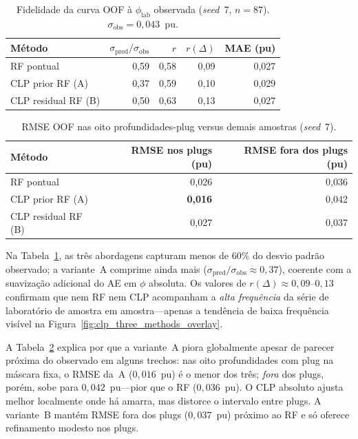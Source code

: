 \documentclass[11pt,a4paper]{article}
\newcommand{\philab}{\ensuremath{\phi_{\mathrm{lab}}}}
\begin{document}
\begin{table}[H]
  \centering
  \caption{Fidelidade da curva OOF à \philab{} observada (\emph{seed}~7,
           $n=87$). $\sigma_{\mathrm{obs}}=0{,}043$~pu.}
  \label{tab:clp_fidelity}
  \small
  \begin{tabular}{lrrrr}
    \toprule
    Método & $\sigma_{\mathrm{pred}}/\sigma_{\mathrm{obs}}$ &
    $r$ & $r(\Delta)$ & MAE (pu) \\
    \midrule
    RF pontual & 0,59 & 0,58 & 0,09 & 0,027 \\
    CLP prior RF (A) & 0,37 & 0,59 & 0,10 & 0,029 \\
    CLP residual RF (B) & 0,50 & 0,63 & 0,13 & 0,027 \\
  \end{tabular}
\end{table}

\begin{table}[H]
  \centering
  \caption{RMSE OOF nas oito profundidades-plug versus demais amostras
           (\emph{seed}~7).}
  \label{tab:clp_plug_vs_nonplug}
  \begin{tabular}{lrr}
    \toprule
    Método & RMSE nos plugs (pu) & RMSE fora dos plugs (pu) \\
    \midrule
    RF pontual & 0,026 & 0,036 \\
    CLP prior RF (A) & \textbf{0,016} & 0,042 \\
    CLP residual RF (B) & 0,027 & 0,037 \\
    \bottomrule
  \end{tabular}
\end{table}

Na Tabela~\ref{tab:clp_fidelity}, as três abordagens capturam menos de
60\% do desvio padrão observado; a variante~A comprime ainda mais
($\sigma_{\mathrm{pred}}/\sigma_{\mathrm{obs}}\approx 0{,}37$), coerente
com a suavização adicional do AE em $\phi$ absoluta.
Os valores de $r(\Delta)\approx 0{,}09$--$0{,}13$ confirmam que nem RF nem
CLP acompanham a \emph{alta frequência} da série de laboratório de
amostra em amostra---apenas a tendência de baixa frequência visível na
Figura~\ref{fig:clp_three_methods_overlay}.

A Tabela~\ref{tab:clp_plug_vs_nonplug} explica por que a variante~A
piora globalmente apesar de parecer próxima do observado em alguns trechos:
nas oito profundidades com plug na máscara fixa, o RMSE da~A
($0{,}016$~pu) é o menor dos três; \emph{fora} dos plugs, porém, sobe para
$0{,}042$~pu---pior que o RF ($0{,}036$~pu).
O CLP absoluto ajusta melhor localmente onde há amarra, mas distorce o
intervalo entre plugs.
A variante~B mantém RMSE fora dos plugs ($0{,}037$~pu) próximo ao RF e
só oferece refinamento modesto nos plugs.
\end{document}

